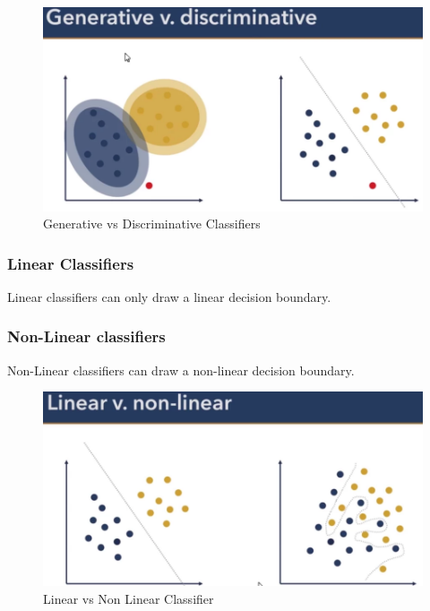 \documentclass[
  11pt,
  british,
]{article}
\begin{document}
\begin{figure}
\centering
\includegraphics{Pasted_image_20220216114704.png}
\caption{Generative vs Discriminative Classifiers}
\end{figure}

\hypertarget{linear-classifiers}{%
\subsubsection{Linear Classifiers}\label{linear-classifiers}}

Linear classifiers can only draw a linear decision boundary.

\hypertarget{non-linear-classifiers}{%
\subsubsection{Non-Linear classifiers}\label{non-linear-classifiers}}

Non-Linear classifiers can draw a non-linear decision boundary.

\begin{figure}
\centering
\includegraphics{Pasted_image_20220216114812.png}
\caption{Linear vs Non Linear Classifier}
\end{figure}
\end{document}
